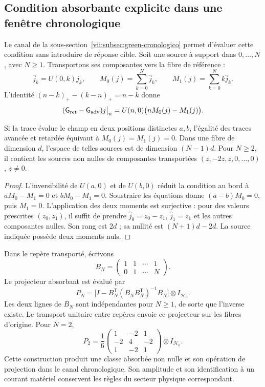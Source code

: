 \subsection{Condition absorbante explicite dans une fenêtre chronologique}
\label{vii:subsec:absorcion-momentos}

Le canal de la sous-section~\ref{vii:subsec:green-cronologico} permet
d'évaluer cette condition sans introduire de réponse cible. Soit une
source à support dans \(0,\ldots,N\), avec \(N\geq1\). Transportons
ses composantes vers la fibre de référence :
\[
 \widehat j_k=U(0,k)j_k,\qquad
 M_0(j)=\sum_{k=0}^N\widehat j_k,\qquad
 M_1(j)=\sum_{k=0}^Nk\widehat j_k.
\]
L'identité \((n-k)_+-(k-n)_+=n-k\) donne
\begin{equation}
 (\mathsf{G}_{\rm ret}-\mathsf{G}_{\rm adv})j\big|_n
 =U(n,0)\bigl(nM_0(j)-M_1(j)\bigr).
 \label{vii:eq:diferencia-green-momentos}
\end{equation}

\begin{proposition}
\label{vii:prop:absorcion-momentos}
Si la trace évalue le champ en deux positions distinctes \(a,b\),
l'égalité des traces avancée et retardée équivaut à
\(M_0(j)=M_1(j)=0\). Dans une fibre de dimension \(d\), l'espace
de telles sources est de dimension \((N-1)d\). Pour \(N\geq2\),
il contient les sources non nulles de composantes transportées
\((z,-2z,z,0,\ldots,0)\), \(z\neq0\).
\end{proposition}
\begin{proof}
L'inversibilité de \(U(a,0)\) et de \(U(b,0)\) réduit la condition
au bord à \(aM_0-M_1=0\) et \(bM_0-M_1=0\).
Soustraire les équations donne \((a-b)M_0=0\), puis \(M_1=0\).
L'application des deux moments est surjective : pour des valeurs prescrites
\((z_0,z_1)\), il suffit de prendre
\(\widehat j_0=z_0-z_1\), \(\widehat j_1=z_1\) et les autres
composantes nulles. Son rang est \(2d\) ; sa nullité est
\((N+1)d-2d\). La source indiquée possède deux moments nuls.
\end{proof}

Dans le repère transporté, écrivons
\[
 B_N=\begin{pmatrix}1&1&\cdots&1\\0&1&\cdots&N\end{pmatrix}.
\]
Le projecteur absorbant est évalué par
\begin{equation}
 P_N=\bigl[I-B_N^{\mathsf T}(B_NB_N^{\mathsf T})^{-1}B_N\bigr]
       \otimes I_{\mathcal H_0}.
 \label{vii:eq:proyector-momentos-cronologicos}
\end{equation}
Les deux lignes de \(B_N\) sont indépendantes pour \(N\geq1\), de sorte que l'inverse existe. Le transport unitaire entre repères envoie ce projecteur sur les fibres d'origine. Pour \(N=2\),
\[
 P_2=\frac16
 \begin{pmatrix}1&-2&1\\-2&4&-2\\1&-2&1\end{pmatrix}
 \otimes I_{\mathcal H_0}.
\]
Cette construction produit une classe absorbée non nulle et son opération de
projection dans le canal chronologique. Son amplitude et son identification à un
courant matériel conservent les règles du secteur physique correspondant.

